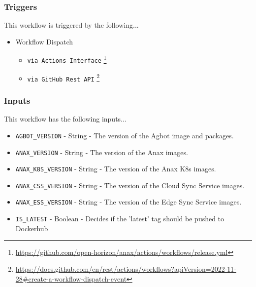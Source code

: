 \documentclass[a4paper,11pt]{article}
\begin{document}
\subsubsection{Triggers}
This workflow is triggered by the following...
\begin{itemize}
    \item Workflow Dispatch
    \begin{itemize}
        \item\verb|via Actions Interface| \footnote{\href{https://github.com/open-horizon/anax/actions/workflows/release.yml}{https://github.com/open-horizon/anax/actions/workflows/release.yml}}
        \item\verb|via GitHub Rest API| \footnote{\href{https://docs.github.com/en/rest/actions/workflows?apiVersion=2022-11-28\#create-a-workflow-dispatch-event}{https://docs.github.com/en/rest/actions/workflows?apiVersion=2022-11-28\#create-a-workflow-dispatch-event}}
    \end{itemize}
\end{itemize}

\subsubsection{Inputs}
This workflow has the following inputs...
\begin{itemize}
    \item\verb|AGBOT_VERSION| - String - The version of the Agbot image and packages.
    \item\verb|ANAX_VERSION| - String - The version of the Anax images.
    \item\verb|ANAX_K8S_VERSION| - String - The version of the Anax K8s images.
    \item\verb|ANAX_CSS_VERSION| - String - The version of the Cloud Sync Service images.
    \item\verb|ANAX_ESS_VERSION| - String - The version of the Edge Sync Service images.
    \item\verb|IS_LATEST| - Boolean - Decides if the 'latest' tag should be pushed to Dockerhub
\end{itemize}
\end{document}
